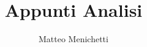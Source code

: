 \documentclass[a4paper,10pt]{book}
\numberwithin{equation}{section}
\theoremstyle{definition}
\begin{document}
\title{Appunti Analisi}
\author{Matteo Menichetti}
\maketitle

\tableofcontents

\printglossary




\end{document}
